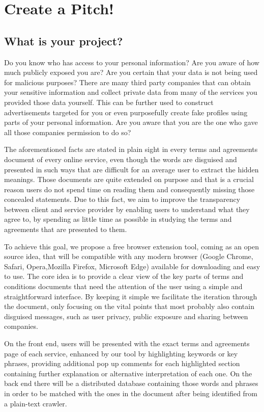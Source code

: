 \section{Create a Pitch!}

\subsection{What is your project?}

Do you know who has access to your personal information? Are you aware of how 
much publicly exposed you are? Are you certain that your data is not being used 
for malicious purposes? There are many third party companies that can obtain 
your sensitive information and collect private data from many of the services 
you provided those data yourself. This can be further used to construct 
advertisements targeted for you or even purposefully create fake profiles using 
parts of your personal information. Are you aware that you are the one who gave 
all those companies permission to do so?

The aforementioned facts are stated in plain sight in every terms and agreements 
document of every online service, even though the words are disguised and 
presented in such ways that are difficult for an average user to extract the 
hidden meanings. Those documents are quite extended on purpose and that is a 
crucial reason users do not spend time on reading them and consequently missing 
those concealed statements. Due to this fact, we aim to improve the transparency 
between client and service provider by enabling users to understand what they 
agree to, by spending as little time as possible in studying the terms and 
agreements that are presented to them.

To achieve this goal, we propose a free browser extension tool, coming as an 
open source idea, that will be compatible with any modern browser (Google 
Chrome, Safari, Opera,Mozilla Firefox, Microsoft Edge) available for downloading 
and easy to use. The core idea is to provide a clear view of the key parts of 
terms and conditions documents that need the attention of the user using a 
simple and straightforward interface. By keeping it simple we facilitate the 
iteration through the document, only focusing on the vital points that most 
probably also contain disguised messages, such as user privacy, public exposure 
and sharing between companies.

On the front end, users will be presented with the exact terms and agreements 
page of each service, enhanced by our tool by highlighting keywords or key 
phrases, providing additional pop up comments for each highlighted section 
containing further explanation or alternative interpretation of each one. On the 
back end there will be a distributed database containing those words and phrases 
in order to be matched with the ones in the document after being identified from 
a plain-text crawler.

